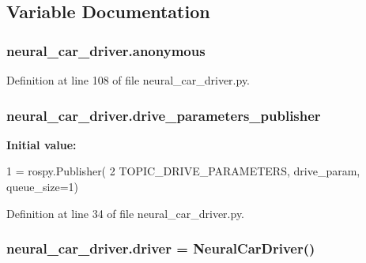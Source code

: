 \subsection{Variable Documentation}
\subsubsection[{\texorpdfstring{anonymous}{anonymous}}]{\setlength{\rightskip}{0pt plus 5cm}neural\+\_\+car\+\_\+driver.\+anonymous}\hypertarget{namespaceneural__car__driver_ae254923f6ec524f563a598feeee010b9}{}\label{namespaceneural__car__driver_ae254923f6ec524f563a598feeee010b9}


Definition at line 108 of file neural\+\_\+car\+\_\+driver.\+py.

\subsubsection[{\texorpdfstring{drive\+\_\+parameters\+\_\+publisher}{drive_parameters_publisher}}]{\setlength{\rightskip}{0pt plus 5cm}neural\+\_\+car\+\_\+driver.\+drive\+\_\+parameters\+\_\+publisher}\hypertarget{namespaceneural__car__driver_ac075b2fda9db2b43e338511958cfe9c2}{}\label{namespaceneural__car__driver_ac075b2fda9db2b43e338511958cfe9c2}
{\bfseries Initial value\+:}
\begin{DoxyCode}
1 = rospy.Publisher(
2     TOPIC\_DRIVE\_PARAMETERS, drive\_param, queue\_size=1)
\end{DoxyCode}


Definition at line 34 of file neural\+\_\+car\+\_\+driver.\+py.

\subsubsection[{\texorpdfstring{driver}{driver}}]{\setlength{\rightskip}{0pt plus 5cm}neural\+\_\+car\+\_\+driver.\+driver = {\bf Neural\+Car\+Driver}()}\hypertarget{namespaceneural__car__driver_a277afd40b4a20897467cac1f802344ee}{}\label{namespaceneural__car__driver_a277afd40b4a20897467cac1f802344ee}


